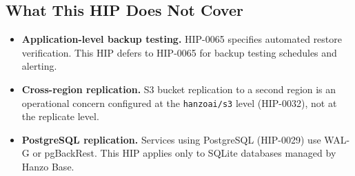 \subsection{What This HIP Does Not Cover}

\begin{itemize}[nosep]
    \item \textbf{Application-level backup testing.} HIP-0065 specifies
    automated restore verification. This HIP defers to HIP-0065 for backup
    testing schedules and alerting.

    \item \textbf{Cross-region replication.} S3 bucket replication to a
    second region is an operational concern configured at the
    \texttt{hanzoai/s3} level (HIP-0032), not at the replicate level.

    \item \textbf{PostgreSQL replication.} Services using PostgreSQL
    (HIP-0029) use WAL-G or pgBackRest. This HIP applies only to SQLite
    databases managed by Hanzo Base.
\end{itemize}

